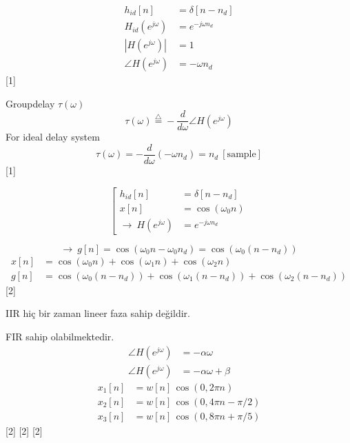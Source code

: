 \documentclass[11pt,a4paper]{article}
\begin{document}

\begin{ornek}
\begin{align*}
h_{id}[n] &= \delta[n-n_d]\\
H_{id}(e^{j\omega}) &= e^{-j\omega n_d}\\
|H(e^{j\omega})| &= 1\\
\angle H(e^{j\omega}) &= -\omega n_d
\end{align*}
[1]
\end{ornek}

Groupdelay $\tau(\omega)$
\[ \tau(\omega) \stackrel{\triangle}{=} -\frac{d}{d\omega}\angle H(e^{j\omega}) \]
For ideal delay system
\[ \tau(\omega) = -\frac{d}{d\omega}(-\omega n_d) = n_d \ [\mathrm{sample}] \]
[1]

\[
\left[\begin{aligned}
h_{id}[n] &= \delta[n-n_d]\\
x[n] &= \cos(\omega_0 n)\\
\rightarrow\ H(e^{j\omega}) &= e^{-j\omega n_d}
\end{aligned}\right.
\]

\[ \rightarrow\ g[n] = \cos(\omega_0 n - \omega_0 n_d) = \cos(\omega_0(n-n_d)) \]
\begin{align*}
x[n] &= \cos(\omega_0 n) + \cos(\omega_1 n) + \cos(\omega_2 n)\\
g[n] &= \cos(\omega_0(n-n_d)) + \cos(\omega_1(n-n_d)) + \cos(\omega_2(n-n_d))
\end{align*}
[2]

IIR hiç bir zaman lineer faza sahip değildir.

FIR sahip olabilmektedir.
\begin{align*}
\angle H(e^{j\omega}) &= -\alpha\omega\\
\angle H(e^{j\omega}) &= -\alpha\omega + \beta
\end{align*}
\begin{align*}
x_1[n] &= w[n]\,\cos(0{,}2\pi n)\\
x_2[n] &= w[n]\,\cos(0{,}4\pi n - \pi/2)\\
x_3[n] &= w[n]\,\cos(0{,}8\pi n + \pi/5)
\end{align*}
[2]
[2]
[2]
\end{document}
